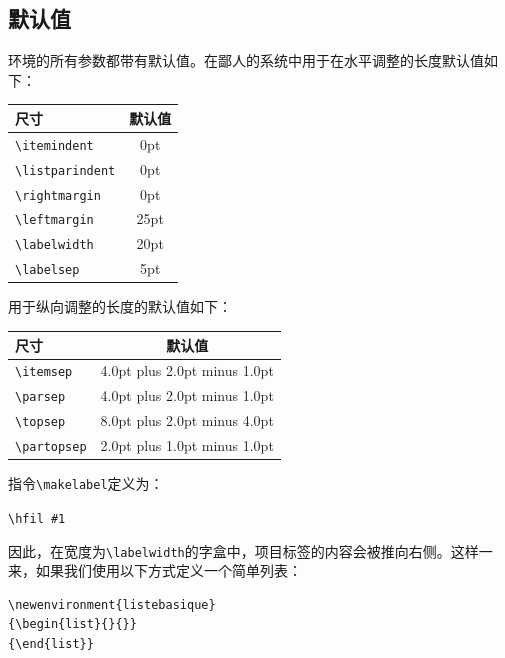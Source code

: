 \subsection{默认值}

环境的所有参数都带有默认值。在鄙人的系统中用于在水平调整的长度默认值如下：

\begin{center}
  \begin{tabular}{|l|c|}
    \hline
    尺寸 & 默认值\\
    \hline
    \verb+\itemindent+    &0pt\\
    \verb+\listparindent+ &0pt\\
    \verb+\rightmargin+   &0pt\\
    \verb+\leftmargin+    &25pt\\
    \verb+\labelwidth+    &20pt\\
    \verb+\labelsep+      &5pt\\
    \hline
  \end{tabular}
\end{center}

用于纵向调整的长度的默认值如下：

\begin{center}
  \begin{tabular}{|l|c|}
    \hline
    尺寸 & 默认值\\
    \hline 
    \verb+\itemsep+       &4.0pt plus 2.0pt minus 1.0pt\\
    \verb+\parsep+        &4.0pt plus 2.0pt minus 1.0pt\\
    \verb+\topsep+        &8.0pt plus 2.0pt minus 4.0pt\\
    \verb+\partopsep+     &2.0pt plus 1.0pt minus 1.0pt\\
    \hline
  \end{tabular}
\end{center}

指令\verb|\makelabel|定义为：

\begin{dmd}
\verb+\hfil #1+
\end{dmd}

因此，在宽度为\verb|\labelwidth|的字盒中，项目标签的内容会被推向右侧。这样一来，如果我们使用以下方式定义一个简单列表：

\begin{dmd}
\begin{verbatim}
\newenvironment{listebasique}
{\begin{list}{}{}}
{\end{list}}\end{verbatim}
\end{dmd}

